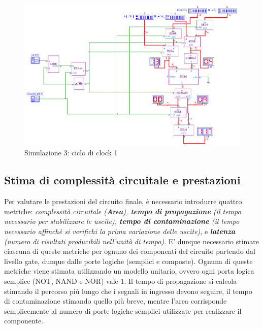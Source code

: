 \documentclass[10pt]{article}
\begin{document}
\begin{itemize}
\begin{figure}[H]
    \begin{minipage}[c]{\textwidth}
    \centering
    \includegraphics[width=\textwidth]{s3c1}
    \caption{Simulazione 3: ciclo di clock 1}
    \label{ }
    \end{minipage}
\end{figure}

\subsection{Stima di complessità circuitale e prestazioni}
Per valutare le prestazioni del circuito finale, è necessario introdurre quattro metriche: \emph{complessità circuitale (\textbf{Area}), \textbf{tempo di propagazione} (il tempo necessario per stabilizzare le uscite), 
\textbf{tempo di contaminazione} (il tempo necessario affinchè si verifichi la prima variazione delle uscite)}, e \emph{\textbf{latenza} (numero di risultati producibili nell'unità di tempo)}.
E' dunque necessario stimare ciascuna di queste metriche per ognuno dei componenti del circuito partendo dal livello gate, dunque dalle porte logiche (semplici e composte).
Ognuna di queste metriche viene stimata utilizzando un modello unitario, ovvero ogni porta logica semplice (NOT, NAND e NOR) vale 1.
Il tempo di propagazione si calcola stimando il percorso più lungo che i segnali in ingresso devono seguire, il tempo di contaminazione stimando quello più breve, mentre l'area corrisponde semplicemente
al numero di porte logiche semplici utilizzate per realizzare il componente.


\end{itemize}
\end{document}
